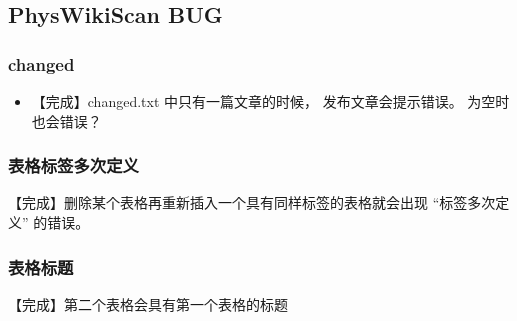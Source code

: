 \subsection{PhysWikiScan BUG}\label{sub_edTODO_5}

\subsubsection{changed}
\begin{itemize}
\item 【完成】changed.txt 中只有一篇文章的时候， 发布文章会提示错误。 为空时也会错误？
\end{itemize}

\subsubsection{表格标签多次定义}
【完成】删除某个表格再重新插入一个具有同样标签的表格就会出现 “标签多次定义” 的错误。

\subsubsection{表格标题}
【完成】第二个表格会具有第一个表格的标题

